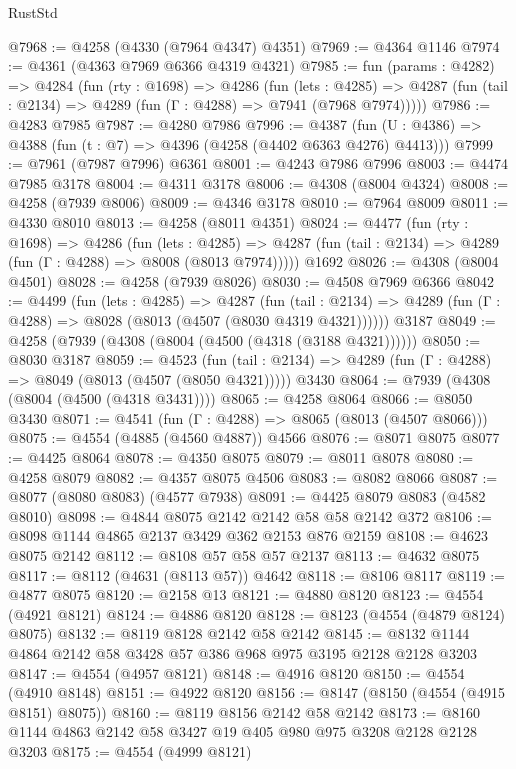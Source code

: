 \begin{lexlean}{RustStd}
\begin{coremodule}
{\begin{coremodule}
{{{{{{{{{{{{{{{{@7968 := @4258 (@4330 (@7964 @4347) @4351)
@7969 := @4364 @1146
@7974 := @4361 (@4363 @7969 @6366 @4319 @4321)
@7985 := fun (params : @4282) =>
  @4284
    (fun (rty : @1698) =>
    @4286
      (fun (lets : @4285) =>
      @4287 (fun (tail : @2134) => @4289 (fun (Γ : @4288) => @7941 (@7968 @7974)))))
@7986 := @4283 @7985
@7987 := @4280 @7986
@7996 := @4387 (fun (U : @4386) => @4388 (fun (t : @7) => @4396 (@4258 (@4402 @6363 @4276) @4413)))
@7999 := @7961 (@7987 @7996) @6361
@8001 := @4243 @7986 @7996
@8003 := @4474 @7985 @3178
@8004 := @4311 @3178
@8006 := @4308 (@8004 @4324)
@8008 := @4258 (@7939 @8006)
@8009 := @4346 @3178
@8010 := @7964 @8009
@8011 := @4330 @8010
@8013 := @4258 (@8011 @4351)
@8024 := @4477
    (fun (rty : @1698) =>
    @4286
      (fun (lets : @4285) =>
      @4287 (fun (tail : @2134) => @4289 (fun (Γ : @4288) => @8008 (@8013 @7974)))))
    @1692
@8026 := @4308 (@8004 @4501)
@8028 := @4258 (@7939 @8026)
@8030 := @4508 @7969 @6366
@8042 := @4499
    (fun (lets : @4285) =>
    @4287
      (fun (tail : @2134) => @4289 (fun (Γ : @4288) => @8028 (@8013 (@4507 (@8030 @4319 @4321))))))
    @3187
@8049 := @4258 (@7939 (@4308 (@8004 (@4500 (@4318 (@3188 @4321))))))
@8050 := @8030 @3187
@8059 := @4523
    (fun (tail : @2134) => @4289 (fun (Γ : @4288) => @8049 (@8013 (@4507 (@8050 @4321)))))
    @3430
@8064 := @7939 (@4308 (@8004 (@4500 (@4318 @3431))))
@8065 := @4258 @8064
@8066 := @8050 @3430
@8071 := @4541 (fun (Γ : @4288) => @8065 (@8013 (@4507 @8066)))
@8075 := @4554 (@4885 (@4560 @4887)) @4566
@8076 := @8071 @8075
@8077 := @4425 @8064
@8078 := @4350 @8075
@8079 := @8011 @8078
@8080 := @4258 @8079
@8082 := @4357 @8075 @4506
@8083 := @8082 @8066
@8087 := @8077 (@8080 @8083) (@4577 @7938)
@8091 := @4425 @8079 @8083 (@4582 @8010)
@8098 := @4844 @8075 @2142 @2142 @58 @58 @2142 @372
@8106 := @8098 @1144 @4865 @2137 @3429 @362 @2153 @876 @2159
@8108 := @4623 @8075 @2142
@8112 := @8108 @57 @58 @57 @2137
@8113 := @4632 @8075
@8117 := @8112 (@4631 (@8113 @57)) @4642
@8118 := @8106 @8117
@8119 := @4877 @8075
@8120 := @2158 @13
@8121 := @4880 @8120
@8123 := @4554 (@4921 @8121)
@8124 := @4886 @8120
@8128 := @8123 (@4554 (@4879 @8124) @8075)
@8132 := @8119 @8128 @2142 @58 @2142
@8145 := @8132 @1144 @4864 @2142 @58 @3428 @57 @386 @968 @975 @3195 @2128 @2128 @3203
@8147 := @4554 (@4957 @8121)
@8148 := @4916 @8120
@8150 := @4554 (@4910 @8148)
@8151 := @4922 @8120
@8156 := @8147 (@8150 (@4554 (@4915 @8151) @8075))
@8160 := @8119 @8156 @2142 @58 @2142
@8173 := @8160 @1144 @4863 @2142 @58 @3427 @19 @405 @980 @975 @3208 @2128 @2128 @3203
@8175 := @4554 (@4999 @8121)
}}}}}}}}}}}}}}}}
\end{coremodule}}
\end{coremodule}
\end{lexlean}
